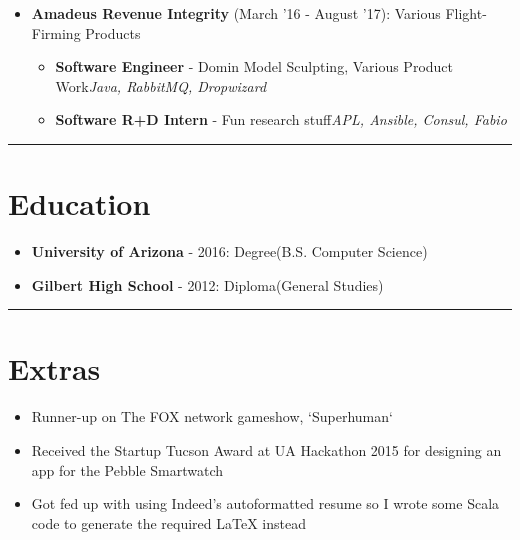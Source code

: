 \documentclass{article}
\begin{document}
\begin{itemize}
\item \textbf{Amadeus Revenue Integrity} {(March '16 - August '17)}: Various Flight-Firming Products 
\begin{itemize}
\item \textbf{Software Engineer} - Domin Model Sculpting, Various Product Work\newline \textit{Java, RabbitMQ, Dropwizard}
\item \textbf{Software R+D Intern} - Fun research stuff\newline \textit{APL, Ansible, Consul, Fabio}
\end{itemize}

\end{itemize}

\noindent\rule{\linewidth}{1pt}

\section*{Education}

\begin{itemize}
\item \textbf{University of Arizona} - 2016: Degree(B.S. Computer Science)
\item \textbf{Gilbert High School} - 2012: Diploma(General Studies)
\end{itemize}

\noindent\rule{\linewidth}{1pt}

\section*{Extras}

\begin{itemize}
\item Runner-up on The FOX network gameshow, `Superhuman`
\item Received the Startup Tucson Award at UA Hackathon 2015 for designing an app for the Pebble Smartwatch
\item Got fed up with using Indeed's autoformatted resume so I wrote some Scala code to generate the required LaTeX instead
\end{itemize}

\vspace*{\fill}
\end{document}
